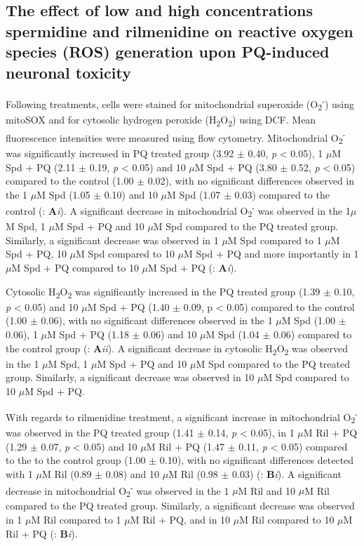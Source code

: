 \subsection{The effect of low and high concentrations spermidine and rilmenidine on reactive oxygen species (ROS) generation upon PQ-induced neuronal toxicity}
Following treatments, cells were stained for mitochondrial superoxide (O\textsubscript{2}\textsuperscript{-}) using mitoSOX and for cytosolic hydrogen peroxide (H\textsubscript{2}O\textsubscript{2}) using DCF. Mean fluorescence intensities were measured using flow cytometry. Mitochondrial O\textsubscript{2}\textsuperscript{-} was significantly increased in PQ treated group (3.92 $\pm$ 0.40, \textit{p} < 0.05), 1 $\mu$M Spd + PQ (2.11 $\pm$ 0.19, \textit{p} < 0.05) and 10 $\mu$M Spd + PQ (3.80 $\pm$ 0.52, \textit{p} < 0.05) compared to the control (1.00 $\pm$ 0.02), with no significant differences observed in the 1 $\mu$M Spd (1.05 $\pm$ 0.10) and 10 $\mu$M Spd (1.07 $\pm$ 0.03) compared to the control (: \textbf{A}\textit{i}). A significant decrease in mitochondrial O\textsubscript{2}\textsuperscript{-} was observed in the 1$\mu$M Spd, 1 $\mu$M Spd + PQ and 10 $\mu$M Spd compared to the PQ treated group. Similarly, a significant decrease was observed in 1 $\mu$M Spd compared to 1 $\mu$M Spd + PQ, 10 $\mu$M Spd compared to 10 $\mu$M Spd + PQ and more importantly in 1 $\mu$M Spd + PQ compared to 10 $\mu$M Spd + PQ (: \textbf{A}\textit{i}). 

Cytosolic H\textsubscript{2}O\textsubscript{2} was significantly increased in the PQ treated group (1.39 $\pm$ 0.10, \textit{p} < 0.05) and 10 $\mu$M Spd + PQ (1.40 $\pm$ 0.09, p < 0.05) compared to the control (1.00 $\pm$ 0.06), with no significant differences observed in the 1 $\mu$M Spd (1.00 $\pm$ 0.06), 1 $\mu$M Spd + PQ (1.18 $\pm$ 0.06) and 10 $\mu$M Spd (1.04 $\pm$ 0.06) compared to the control group (: \textbf{A}\textit{ii}). A significant decrease in cytosolic H\textsubscript{2}O\textsubscript{2} was observed in the 1 $\mu$M Spd, 1 $\mu$M Spd + PQ and 10 $\mu$M Spd compared to the PQ treated group. Similarly, a significant decrease was observed in 10 $\mu$M Spd compared to 10 $\mu$M Spd + PQ.

With regards to rilmenidine treatment, a significant increase in mitochondrial O\textsubscript{2}\textsuperscript{-} was observed in the PQ treated group (1.41 $\pm$ 0.14, \textit{p} < 0.05), in 1 $\mu$M Ril + PQ (1.29 $\pm$ 0.07, \textit{p} < 0.05) and 10 $\mu$M Ril + PQ (1.47 $\pm$ 0.11, \textit{p} < 0.05) compared to the to the control group (1.00 $\pm$ 0.10), with no significant differences detected with 1 $\mu$M Ril (0.89 $\pm$ 0.08) and 10 $\mu$M Ril (0.98 $\pm$ 0.03) (: \textbf{B}\textit{i}). A significant decrease in mitochondrial O\textsubscript{2}\textsuperscript{-} was observed in the 1 $\mu$M Ril and 10 $\mu$M Ril compared to the PQ treated group. Similarly, a significant decrease was observed in 1 $\mu$M Ril compared to 1 $\mu$M Ril + PQ, and in 10 $\mu$M Ril compared to 10 $\mu$M Ril + PQ (: \textbf{B}\textit{i}). 

